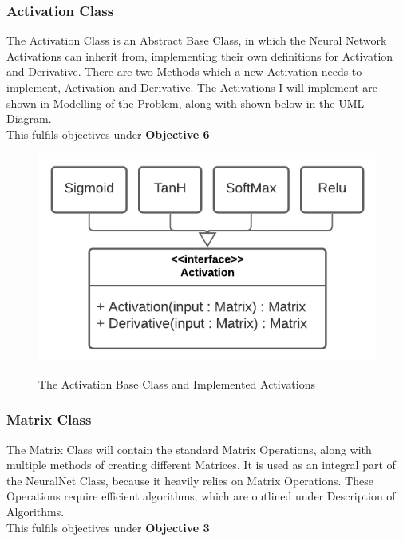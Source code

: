 \begin{flushleft}
            \subsubsection{Activation Class}
                The Activation Class is an Abstract Base Class, in which the Neural Network Activations can inherit from, implementing
                their own definitions for Activation and Derivative. There are two Methods which a new Activation needs to implement,
                Activation and Derivative. The Activations I will implement are shown in Modelling of the Problem, along with shown
                below in the UML Diagram.\\
                \vspace{0.2cm}
                This fulfils objectives under \textbf{Objective 6} \\

                \begin{figure}[H]
                    \centering
                    \includegraphics[width=.65\textwidth]{Images/Design/Classes/Activation.png} \\
                    \caption*{The Activation Base Class and Implemented Activations}
                \end{figure}
            \subsubsection{Matrix Class}
                The Matrix Class will contain the standard Matrix Operations, along with multiple methods of creating different 
                Matrices. It is used as an integral part of the NeuralNet Class, because it heavily relies on Matrix Operations.
                These Operations require efficient algorithms, which are outlined under Description of Algorithms. \\
                \vspace{0.2cm}
                This fulfils objectives under \textbf{Objective 3} \\


\end{flushleft}
